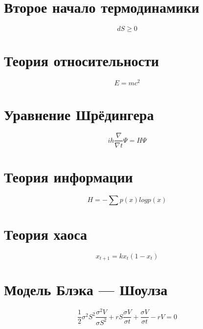\documentclass[a4paper,12pt]{article}
\begin{document}
\section{Второе начало термодинамики}
$$dS\geq 0$$
\section{Теория относительности}
$$E=mc^2$$
\section{Уравнение Шрёдингера}
$$ih\frac{\nabla}{\nabla t}\Psi=H\Psi$$
\section{Теория информации}
$$H= - \sum p(x)logp(x)$$
\section{Теория хаоса}
$$x_{t+1}=kx_t(1-x_t)$$
\section{Модель Блэка — Шоулза}
$$\frac{1}{2}\sigma^2S^2 \frac{\sigma^2 V}{\sigma S^2}+rS\frac{\sigma V}{\sigma t}+\frac{\sigma V}{\sigma t}-rV=0$$
\end{document}
